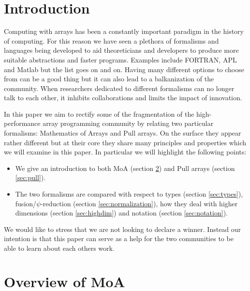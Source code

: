 \documentclass[preprint]{sigplanconf}
\begin{document}



\section{Introduction}

Computing with arrays has been a constantly important paradigm in the
history of computing. For this reason we have seen a plethora of
formalisms and languages being developed to aid theoreticians and
developers to produce more suitable abstractions and faster programs.
Examples include FORTRAN, APL and Matlab but the list goes on and on.
Having many different options to choose from can be a good thing but
it can also lead to a balkanization of the community. When researchers
dedicated to different formalisms can no longer talk to each other,  it
inhibits collaborations and limits the impact of innovation.

In this paper we aim to rectify some of the fragmentation of the
high-performance array programming community by relating two
particular formalisms: Mathematics of Arrays and Pull arrays. On the
surface they appear rather different but at their core they share many
principles and properties which we will examine in this paper. In
particular we will highlight the following points:
\begin{itemize}
\item We give an introduction to both MoA (section \ref{sec:moa}) and Pull
  arrays (section \ref{sec:pull}).
\item The two formalisms are compared with respect to types (section
  \ref{sec:types}), fusion/\(\psi\)-reduction (section
  \ref{sec:normalization}), 
  how they deal with higher dimensions (section \ref{sec:highdim})
  and notation (section \ref{sec:notation}).
\end{itemize}

We would like to stress that we are not looking to declare a
winner. Instead our intention is that this paper can serve as a help
for the two communities to be able to learn about each others work.

\section{Overview of MoA}
\label{sec:moa}

\end{document}
